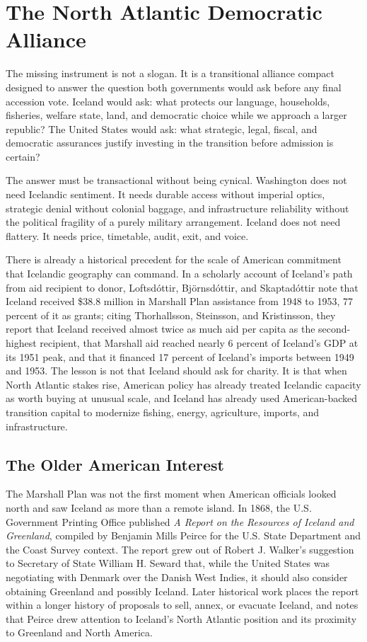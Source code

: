\documentclass[11pt,a4paper]{article}
\begin{document}
\section{The North Atlantic Democratic Alliance}
The missing instrument is not a slogan. It is a transitional alliance compact designed to answer the question both governments would ask before any final accession vote. Iceland would ask: what protects our language, households, fisheries, welfare state, land, and democratic choice while we approach a larger republic? The United States would ask: what strategic, legal, fiscal, and democratic assurances justify investing in the transition before admission is certain?

The answer must be transactional without being cynical. Washington does not need Icelandic sentiment. It needs durable access without imperial optics, strategic denial without colonial baggage, and infrastructure reliability without the political fragility of a purely military arrangement. Iceland does not need flattery. It needs price, timetable, audit, exit, and voice.

There is already a historical precedent for the scale of American commitment that Icelandic geography can command. In a scholarly account of Iceland's path from aid recipient to donor, Loftsdóttir, Björnsdóttir, and Skaptadóttir note that Iceland received \$38.8 million in Marshall Plan assistance from 1948 to 1953, 77 percent of it as grants; citing Thorhallsson, Steinsson, and Kristinsson, they report that Iceland received almost twice as much aid per capita as the second-highest recipient, that Marshall aid reached nearly 6 percent of Iceland's GDP at its 1951 peak, and that it financed 17 percent of Iceland's imports between 1949 and 1953.\cite{icelandforeignaid} The lesson is not that Iceland should ask for charity. It is that when North Atlantic stakes rise, American policy has already treated Icelandic capacity as worth buying at unusual scale, and Iceland has already used American-backed transition capital to modernize fishing, energy, agriculture, imports, and infrastructure.

\subsection{The Older American Interest}
The Marshall Plan was not the first moment when American officials looked north and saw Iceland as more than a remote island. In 1868, the U.S. Government Printing Office published \textit{A Report on the Resources of Iceland and Greenland}, compiled by Benjamin Mills Peirce for the U.S. State Department and the Coast Survey context.\cite{peirce1868} The report grew out of Robert J. Walker's suggestion to Secretary of State William H. Seward that, while the United States was negotiating with Denmark over the Danish West Indies, it should also consider obtaining Greenland and possibly Iceland. Later historical work places the report within a longer history of proposals to sell, annex, or evacuate Iceland, and notes that Peirce drew attention to Iceland's North Atlantic position and its proximity to Greenland and North America.\cite{gissurarsonproposals}
\end{document}

